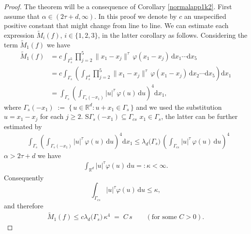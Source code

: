 \documentclass{article}
\theoremstyle{definition}
\numberwithin{equation}{section}
\theoremstyle{remark}
\begin{document}
\begin{proof}
    The theorem will be a consequence of Corollary \ref{normalapp1k2}. First assume that $\alpha \in (2\tau + d, \infty)$. In this proof we denote by $c$ an unspecified positive constant that might change from line to line. We can estimate each expression $\widetilde{M}_i(f)$, $i \in \{1,2,3 \}$, in the latter corollary as follows. Considering the term $\widetilde{M}_1(f)$ we have
    \begin{align*}
\widetilde{M}_1(f)
&= c \int_{\Gamma_s^5} \prod_{j=2}^{5} \|x_1-x_j\|^{\tau}\,\varphi(x_1-x_j)\,\mathrm{d}x_1\cdots \mathrm{d}x_5 \\[4pt]
&= c\int_{\Gamma_s} \left( \int_{\Gamma_s^4} \prod_{j=2}^{5}  \|x_1-x_j \|^{\tau}\,\varphi(x_1-x_j)\,\mathrm{d}x_2\cdots \mathrm{d}x_5 \right) \mathrm{d}x_1 \\[4pt]
&= \int_{\Gamma_s} \left( \int_{\Gamma_s(-x_1)} |u|^{\tau}\,\varphi(u)\,\mathrm{d}u \right)^{4} \mathrm{d}x_1,
\end{align*}
where $\Gamma_s(-x_1) \;:=\; \{\, u \in \mathbb{R}^d : u + x_1 \in \Gamma_s \,\}$ and we used the substitution $u=x_1-x_j$ for each $j\ge 2$. S$\Gamma_s(-x_1)\subseteq \Gamma_{cs}$ $x_1\in\Gamma_s$, the latter can be further estimated by
\begin{align*}
&\int_{\Gamma_s} \left( \int_{\Gamma_s(-x_1)} |u|^{\tau}\,\varphi(u)\,\mathrm{d}u \right)^{4} \mathrm{d}x_1 \leq \lambda_d\big(\Gamma_s\big)\,\left( \int_{\Gamma_{cs}} |u|^{\tau}\,\varphi(u)\,\mathrm{d}u \right)^{4}
\end{align*}
$\alpha>2\tau+d$ we have
\begin{align*}
\int_{\mathbb{R}^d} |u|^{\tau}\varphi(u)\,\mathrm{d}u =:\kappa<\infty.
\end{align*}
Consequently
$$\int_{\Gamma_{cs}} |u|^{\tau}\varphi(u)\,\mathrm{d}u \leq \kappa,$$
and therefore
\begin{align} \label{cltedgelengthsm11}
\widetilde{M}_1(f) \leq  c\lambda_d\big(\Gamma_s\big)\,\kappa^{4}
\;=\; C\,s\qquad(\text{for some }C>0).
\end{align}




\end{proof}
\end{document}
